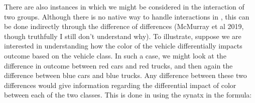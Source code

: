 There are also instances in which we might be considered in the interaction of two groups. Although there is no native way to handle interactions in , this can be done indirectly through the difference of differences (McMurray et al 2019, though truthfully I still don't understand why). To illustrate, suppose we are interested in understanding how the color of the vehicle differentially impacts outcome based on the vehicle class. In such a case, we might look at the difference in outcome between red cars and red trucks, and then again the difference between blue cars and blue trucks. Any difference between these two differences would give information regarding the differential impact of color between each of the two classes. This is done in  using the  synatx in the formula:






